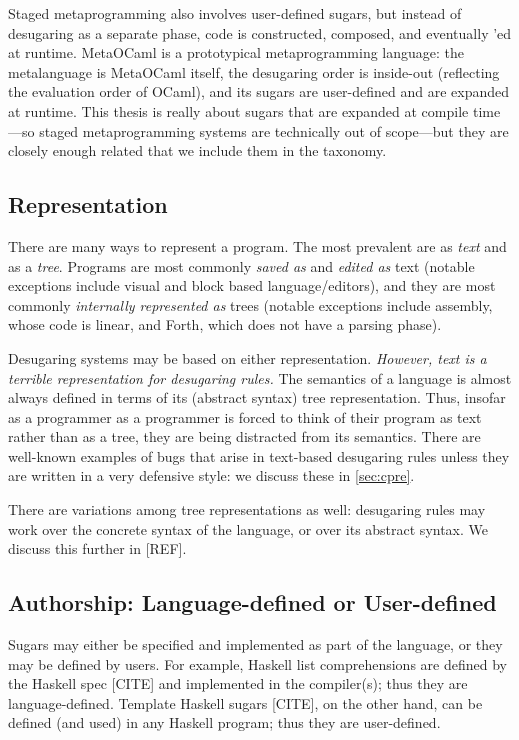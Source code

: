 Staged metaprogramming also involves user-defined sugars, but instead
of desugaring as a separate phase, code is constructed, composed, and
eventually 'ed at runtime. MetaOCaml is a prototypical
metaprogramming language: the metalanguage is MetaOCaml itself,
the desugaring order is inside-out (reflecting the evaluation
order of OCaml), and its sugars are user-defined and are expanded at runtime.
This thesis is really about sugars that are expanded
at compile time---so staged metaprogramming systems are technically out of scope---but
they are closely enough related that we include them in the taxonomy.


\subsection{Representation}

There are many ways to represent a program. The most prevalent are as
\emph{text} and as a \emph{tree}. Programs are most commonly
\emph{saved as} and \emph{edited as} text (notable exceptions include
visual and block based language/editors), and they are most commonly
\emph{internally represented as} trees (notable exceptions include
assembly, whose code is linear, and Forth, which does not have a
parsing phase).

Desugaring systems may be based on either representation.
\emph{However, text is a terrible representation for desugaring rules.}
The semantics of a language is almost always defined in terms of its
(abstract syntax) tree representation. Thus, insofar as a programmer
as a programmer is forced to think of their program as text rather
than as a tree, they are being distracted from its semantics. There
are well-known examples of bugs that arise in text-based desugaring
rules unless they are written in a very defensive style: we discuss
these in \ref{sec:cpre}.

There are variations among tree representations as well: desugaring
rules may work over the concrete syntax of the language, or over its
abstract syntax. We discuss this further in [REF].

\subsection{Authorship: Language-defined or User-defined}

Sugars may either be specified and implemented as part of the
language, or they may be defined by users. For example, Haskell list
comprehensions are defined by the Haskell spec [CITE] and implemented
in the compiler(s); thus they are language-defined. Template Haskell
sugars [CITE], on the other hand, can be defined (and used) in any
Haskell program; thus they are user-defined.

